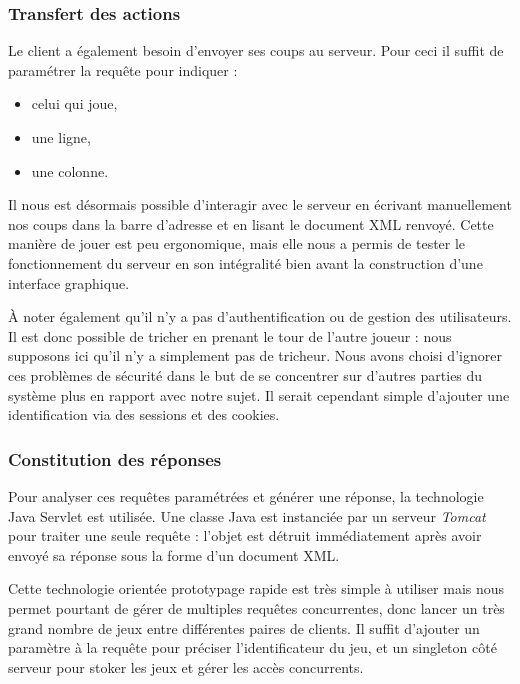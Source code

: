\subsubsection{Transfert des actions}
Le client a également besoin d'envoyer ses coups au serveur. Pour ceci il suffit de paramétrer la requête pour indiquer :
\begin{itemize}
\item celui qui joue,
\item une ligne,
\item une colonne.
\end{itemize}
Il nous est désormais possible d'interagir avec le serveur en écrivant manuellement nos coups dans la barre d'adresse et en lisant le document XML renvoyé. Cette manière de jouer est peu ergonomique, mais elle nous a permis de tester le fonctionnement du serveur en son intégralité bien avant la construction d'une interface graphique.

À noter également qu'il n'y a pas d'authentification ou de gestion des utilisateurs. Il est donc possible de \og tricher \fg{} en prenant le tour de l'autre joueur  : nous supposons ici qu'il n'y a simplement pas de tricheur. Nous avons choisi d'ignorer ces problèmes de sécurité dans le but de se concentrer sur d'autres parties du système plus en rapport avec notre sujet. Il serait cependant simple d'ajouter une identification via des sessions et des cookies.
\subsubsection{Constitution des réponses}
Pour analyser ces requêtes paramétrées et générer une réponse, la technologie \og Java Servlet \fg {} est utilisée. Une classe Java est instanciée par un serveur \emph{Tomcat} pour traiter une seule requête : l'objet est détruit immédiatement après avoir envoyé sa réponse sous la forme d'un document XML.

Cette technologie orientée prototypage rapide est très simple à utiliser mais nous permet pourtant de gérer de multiples requêtes concurrentes, donc lancer un très grand nombre de jeux entre différentes paires de clients. Il suffit d'ajouter un paramètre à la requête pour préciser l'identificateur du jeu, et un singleton côté serveur pour stoker les jeux et gérer les accès concurrents.
